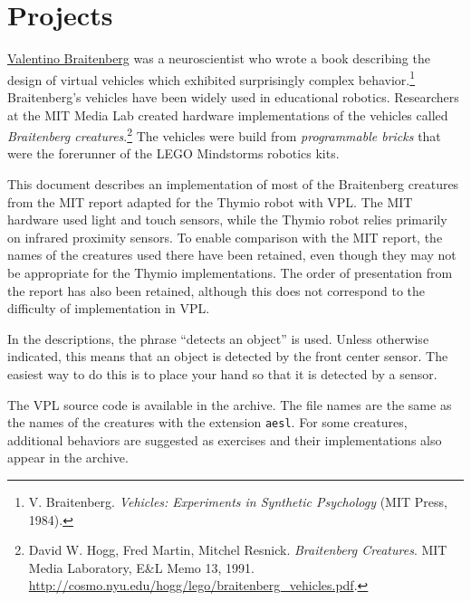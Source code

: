 \part{Projects}

\label{ch.brait}


\href{http://en.wikipedia.org/wiki/Valentino_Braitenberg}{Valentino
Braitenberg} was a neuroscientist who wrote a book describing
the design of virtual vehicles which exhibited surprisingly complex
behavior.\footnote{V. Braitenberg. \textit{Vehicles: Experiments in
Synthetic Psychology} (MIT Press, 1984).} Braitenberg's vehicles have
been widely used in educational robotics. Researchers at the MIT Media
Lab created hardware implementations of the vehicles called
\emph{Braitenberg creatures}.\footnote{David W. Hogg, Fred Martin,
Mitchel Resnick. \textit{Braitenberg Creatures}. MIT Media Laboratory,
E\&L Memo 13, 1991.
\href{http://cosmo.nyu.edu/hogg/lego/braitenberg_vehicles.pdf}{http://cosmo.nyu.edu/hogg/lego/braitenberg\_vehicles.pdf}.} The
vehicles were build from \emph{programmable bricks} that were the
forerunner of the LEGO Mindstorms robotics kits.

This document describes an implementation of most of the Braitenberg
creatures from the MIT report adapted for the Thymio robot with VPL. The
MIT hardware used light and touch sensors, while the Thymio robot relies
primarily on infrared proximity sensors. To enable comparison with the
MIT report, the names of the creatures used there have been retained,
even though they may not be appropriate for the Thymio implementations.
The order of presentation from the report has also been retained,
although this does not correspond to the difficulty of implementation
in VPL.

In the descriptions, the phrase ``detects an object'' is used. Unless
otherwise indicated, this means that an object is detected by the front
center sensor. The easiest way to do this is to place your hand
so that it is detected by a sensor.

The \textsc{VPL} source code is available in the archive. The file names
are the same as the names of the creatures with the extension
\texttt{\small aesl}. For some creatures, additional behaviors are
suggested as exercises and their implementations also appear in the
archive.


